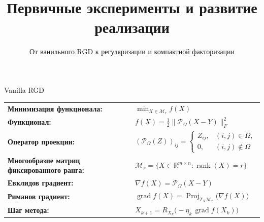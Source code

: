 \documentclass[aspectratio=169,xcolor=dvipsnames]{beamer}
\title{Первичные эксперименты и развитие реализации}
\subtitle{От ванильного RGD к регуляризации и компактной факторизации}
\author{}
\institute{НИУ ВШЭ}
\date{}
\begin{document}
\begin{frame}{Vanilla RGD}
\footnotesize
\renewcommand{\arraystretch}{1.22}
\begin{center}
\begin{tabular}{@{}>{\raggedright\arraybackslash\bfseries}p{}p{}@{}}
Минимизация функционала: &
$\displaystyle \min_{X\in \mathcal M_r} f(X)$
\\
Функционал: &
$\displaystyle f(X)=\frac12\lVert \mathcal P_{\Omega}(X-Y)\rVert_F^2$
\\
Оператор проекции: &
$\displaystyle (\mathcal P_\Omega(Z))_{ij}=
\begin{cases}
Z_{ij}, & (i,j)\in\Omega,\\
0, & (i,j)\notin\Omega
\end{cases}$
\\
Многообразие матриц фиксированного ранга: &
$\displaystyle \mathcal M_r = \{X\in\mathbb R^{m\times n}: \operatorname{rank}(X)=r\}$
\\
Евклидов градиент: &
$\displaystyle \nabla f(X)=\mathcal P_{\Omega}(X-Y)$
\\
Риманов градиент: &
$\displaystyle \operatorname{grad} f(X)=\operatorname{Proj}_{T_X\mathcal M_r}\bigl(\nabla f(X)\bigr)$
\\
Шаг метода: &
$\displaystyle X_{k+1}=R_{X_k}\bigl(-\eta_k\,\operatorname{grad} f(X_k)\bigr)$
\end{tabular}
\end{center}
\end{frame}
\end{document}
